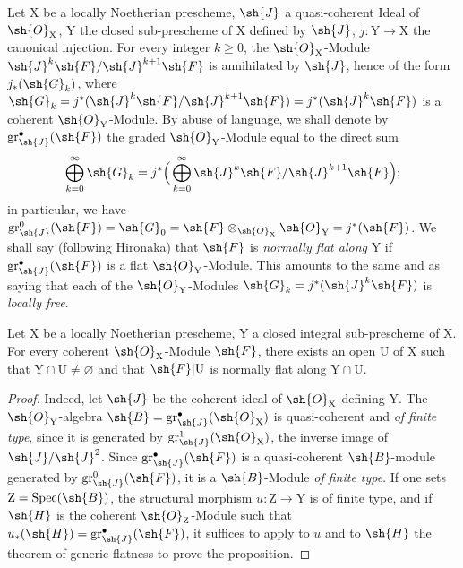 \begin{env}[6.10.1]
\label{IV.6.10.1}
Let $\mathrm{X}$ be a locally Noetherian prescheme, $\sh{J}$ a quasi-coherent Ideal of $\sh{O}_\mathrm{X}$, $\mathrm{Y}$ the closed sub-prescheme of $\mathrm{X}$ defined by $\sh{J}$, $j:\mathrm{Y}\to\mathrm{X}$ the canonical injection. For every integer $k\geqslant 0$, the $\sh{O}_\mathrm{X}$-Module $\sh{J}^k\sh{F}/\sh{J}^{k+1}\sh{F}$ is annihilated by $\sh{J}$, hence of the form $j_*(\sh{G}_k)$, where $\sh{G}_k=j^*(\sh{J}^k\sh{F}/\sh{J}^{k+1}\sh{F})=j^*(\sh{J}^k\sh{F})$ is a coherent $\sh{O}_\mathrm{Y}$-Module. By abuse of language, we shall denote by $\operatorname{gr}^{\bullet}_\sh{J}(\sh{F})$ the graded $\sh{O}_\mathrm{Y}$-Module equal to the direct sum
\[
\bigoplus_{k=0}^{\infty}\sh{G}_k = j^*\Big(\bigoplus_{k=0}^{\infty}\sh{J}^k\sh{F}/\sh{J}^{k+1}\sh{F}\Big);
\]
  in particular, we have $\operatorname{gr}^0_\sh{J}(\sh{F})=\sh{G}_0=\sh{F}\otimes_{\sh{O}_\mathrm{X}}\sh{O}_\mathrm{Y}=j^*(\sh{F})$. We shall say (following Hironaka) that $\sh{F}$ is \emph{normally flat along} $\mathrm{Y}$ if $\operatorname{gr}^{\bullet}_\sh{J}(\sh{F})$ is a flat $\sh{O}_\mathrm{Y}$-Module. This amounts to the same  and  as saying that each of the $\sh{O}_\mathrm{Y}$-Modules $\sh{G}_k=j^*(\sh{J}^k\sh{F})$ is \emph{locally free}.
\end{env}

\begin{proposition}[6.10.2]
\label{IV.6.10.2}
Let $\mathrm{X}$ be a locally Noetherian prescheme, $\mathrm{Y}$ a closed integral sub-prescheme of $\mathrm{X}$. For every coherent $\sh{O}_\mathrm{X}$-Module $\sh{F}$, there exists an open $\mathrm{U}$ of $\mathrm{X}$ such that $\mathrm{Y}\cap\mathrm{U}\neq\varnothing$ and that $\sh{F}|\mathrm{U}$ is normally flat along $\mathrm{Y}\cap\mathrm{U}$.
\end{proposition}

\begin{proof}
Indeed, let $\sh{J}$ be the coherent ideal of $\sh{O}_\mathrm{X}$ defining $\mathrm{Y}$. The $\sh{O}_\mathrm{Y}$-algebra $\sh{B}=\operatorname{gr}^{\bullet}_\sh{J}(\sh{O}_\mathrm{X})$ is quasi-coherent and \emph{of finite type}, since it is generated by $\operatorname{gr}^1_\sh{J}(\sh{O}_\mathrm{X})$, the inverse image of $\sh{J}/\sh{J}^2$. Since $\operatorname{gr}^{\bullet}_\sh{J}(\sh{F})$ is a quasi-coherent $\sh{B}$-module generated by $\operatorname{gr}^0_\sh{J}(\sh{F})$, it is a $\sh{B}$-Module \emph{of finite type}. If one sets $\mathrm{Z}=\operatorname{Spec}(\sh{B})$, the structural morphism $u:\mathrm{Z}\to\mathrm{Y}$ is of finite type, and if $\sh{H}$ is the coherent $\sh{O}_\mathrm{Z}$-Module such that $u_*(\sh{H})=\operatorname{gr}^{\bullet}_\sh{J}(\sh{F})$, it suffices to apply to $u$ and to $\sh{H}$ the theorem of generic flatness  to prove the proposition.
\end{proof}

